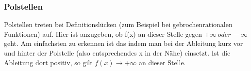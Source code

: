 
\subsubsection{Polstellen}
Polstellen treten bei Definitionslücken (zum Beispiel bei gebrochenrationalen Funktionen) auf. Hier ist anzugeben, ob f(x) an dieser Stelle gegen \(+\infty\ oder\ -\infty\) geht. Am einfachsten zu erkennen ist das indem man bei der Ableitung kurz vor und hinter der Polstelle (also entsprechendes x in der Nähe) einsetzt. Ist die Ableitung dort positiv, so gilt \(f(x)\rightarrow + \infty\) an dieser Stelle.

